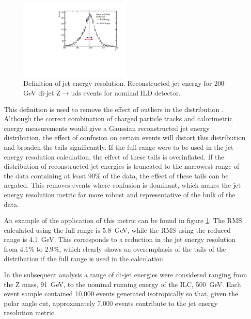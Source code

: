 \begin{figure}[h!]
\centering
\includegraphics[width=0.5\textwidth]{OptimisationStudies/Plots/MethodDescription/RMS90Plot.pdf}
\caption[Definition of jet energy resolution.   Reconstructed jet energy for 200 GeV di-jet Z$\rightarrow$uds events for nominal ILD detector.]{Definition of jet energy resolution.   Reconstructed jet energy for 200 GeV di-jet Z$\rightarrow$uds events for nominal ILD detector.}
\label{fig:rms90defintion}
\end{figure} 

This definition is used to remove the effect of outliers in the distribution \cite{arXiv:0907.3577}.  Although the correct combination of charged particle tracks and calorimetric energy measurements would give a Gaussian reconstructed jet energy distribution, the effect of confusion on certain events will distort this distribution and broaden the tails significantly.  If the full range were to be used in the jet energy resolution calculation, the effect of these tails is overinflated.  If the distribution of reconstructed jet energies is truncated to the narrowest range of the data containing at least $90\%$ of the data, the effect of these tails can be negated.  This removes events where confusion is dominant, which makes the jet energy resolution metric far more robust and representative of the bulk of the data.  

An example of the application of this metric can be found in figure \ref{fig:rms90defintion}.  The RMS calculated using the full range is 5.8~GeV, while the RMS using the reduced range is 4.1~GeV.  This corresponds to a reduction in the jet energy resolution from $4.1\%$ to $2.9\%$, which clearly shows an overemphasis of the tails of the distribution if the full range is used in the calculation.

In the subsequent analysis a range of di-jet energies were considered ranging from the Z mass, 91~GeV, to the nominal running energy of the ILC, 500~GeV.  Each event sample contained 10,000 events generated isotropically so that, given the polar angle cut, approximately 7,000 events contribute to the jet energy resolution metric. 

